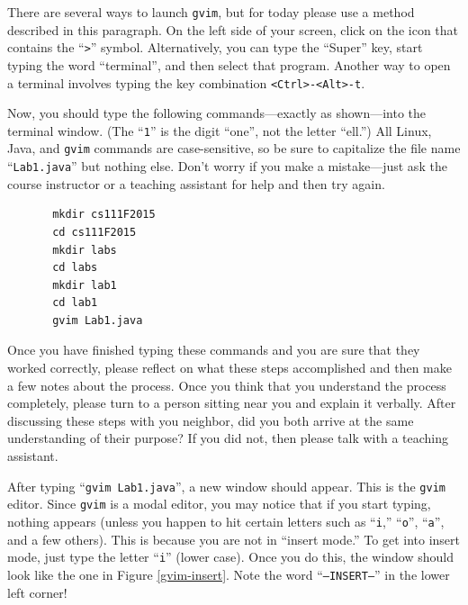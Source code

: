 There are several ways to launch {\tt gvim}, but for today please use a method described in this paragraph.  On the
left side of your screen, click on the icon that contains the ``{\tt >}'' symbol.  Alternatively, you can type the
``Super'' key, start typing the word ``terminal'', and then select that program.  Another way to open a terminal
involves typing the key combination {\tt <Ctrl>-<Alt>-t}.


Now, you should type the following commands---exactly as shown---into the terminal window.  (The ``{\tt 1}'' is the
  digit ``one'', not the letter ``ell.'') All Linux, Java, and {\tt gvim} commands are case-sensitive, so be sure to
capitalize the file name ``{\tt Lab1.java}'' but nothing else.  Don't worry if you make a mistake---just ask the course
instructor or a teaching assistant for help and then try again.

\vspace*{-.1in}
\begin{verbatim}
       mkdir cs111F2015
       cd cs111F2015
       mkdir labs
       cd labs
       mkdir lab1
       cd lab1
       gvim Lab1.java
\end{verbatim}
\vspace*{-.1in}

Once you have finished typing these commands and you are sure that they worked correctly, please reflect on what these
steps accomplished and then make a few notes about the process.  Once you think that you understand the process
completely, please turn to a person sitting near you and explain it verbally.  After discussing these steps with you
neighbor, did you both arrive at the same understanding of their purpose? If you did not, then please talk with a teaching
assistant.

After typing ``{\tt gvim Lab1.java}'', a new window should appear. This is the {\tt gvim} editor.  Since {\tt gvim} is a
modal editor, you may notice that if you start typing, nothing appears (unless you happen to hit certain letters such as
  ``{\tt i},'' ``{\tt o}'', ``{\tt a}'', and a few others). This is because you are not in ``insert mode.'' To get into
insert mode, just type the letter ``{\tt i}'' (lower case). Once you do this, the window should look like the one in
Figure \ref{gvim-insert}. Note the word ``{\tt --INSERT--}'' in the lower left corner!

